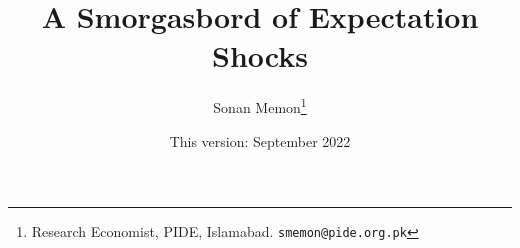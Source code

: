 \documentclass[12pt]{article}
\newcommand{\1}{\mathbbm 1}
\begin{document}
	
	
	
	
	
	
	\vspace{-0.5ex}
	
	
	
	
	
	
	
	
	\newpage{}
	
	
	
	
	
	
	\title{{A Smorgasbord of Expectation Shocks
			}}
			
			
			
			\date{This version: September 2022}%
		
		
		\author{Sonan Memon\footnote{Research Economist, PIDE, Islamabad. \texttt{smemon@pide.org.pk}}}
		
		
		
		\newpage{}
		
		\maketitle
		\vspace{-2ex}
		
		
		
		
		
		
		
		
		
\end{document}

